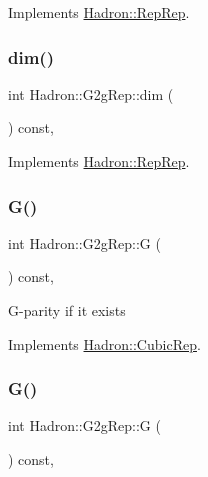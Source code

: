 Implements \mbox{\hyperlink{structHadron_1_1RepRep_a92c8802e5ed7afd7da43ccfd5b7cd92b}{Hadron\+::\+Rep\+Rep}}.

\mbox{\label{structHadron_1_1G2gRep_a8aa2fce05b77da3aab118ec1e5f16687}} 
\subsubsection{\texorpdfstring{dim()}{dim()}\hspace{0.1cm}{\footnotesize\ttfamily [3/3]}}
{\footnotesize\ttfamily int Hadron\+::\+G2g\+Rep\+::dim (\begin{DoxyParamCaption}{ }\end{DoxyParamCaption}) const\hspace{0.3cm}{\ttfamily [inline]}, {\ttfamily [virtual]}}



Implements \mbox{\hyperlink{structHadron_1_1RepRep_a92c8802e5ed7afd7da43ccfd5b7cd92b}{Hadron\+::\+Rep\+Rep}}.

\mbox{\label{structHadron_1_1G2gRep_a417bc3b0be59398720597ac859ab6b69}} 
\subsubsection{\texorpdfstring{G()}{G()}\hspace{0.1cm}{\footnotesize\ttfamily [1/2]}}
{\footnotesize\ttfamily int Hadron\+::\+G2g\+Rep\+::G (\begin{DoxyParamCaption}{ }\end{DoxyParamCaption}) const\hspace{0.3cm}{\ttfamily [inline]}, {\ttfamily [virtual]}}

G-\/parity if it exists 

Implements \mbox{\hyperlink{structHadron_1_1CubicRep_a52104e43266d1614c00bbd1c3b395458}{Hadron\+::\+Cubic\+Rep}}.

\mbox{\label{structHadron_1_1G2gRep_a417bc3b0be59398720597ac859ab6b69}} 
\subsubsection{\texorpdfstring{G()}{G()}\hspace{0.1cm}{\footnotesize\ttfamily [2/2]}}
{\footnotesize\ttfamily int Hadron\+::\+G2g\+Rep\+::G (\begin{DoxyParamCaption}{ }\end{DoxyParamCaption}) const\hspace{0.3cm}{\ttfamily [inline]}, {\ttfamily [virtual]}}

